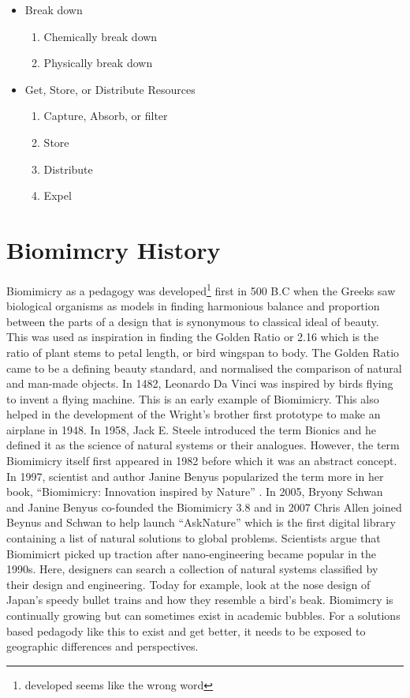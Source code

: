 \begin{itemize}
\item Break down
  \begin{enumerate}
    \item Chemically break down
    \item Physically break down
  \end{enumerate}

\item Get, Store, or Distribute Resources
  \begin{enumerate}
    \item Capture, Absorb, or filter
    \item Store
    \item Distribute
    \item Expel
  \end{enumerate}
  
\end{itemize}

\section{Biomimcry History}

Biomimicry as a pedagogy was developed\footnote{developed seems like the wrong word} first in 500 B.C when the Greeks saw biological organisms as models in finding harmonious balance and proportion between the parts of a design that is synonymous to classical ideal of beauty. This was used as inspiration in finding the Golden Ratio or 2.16 which is the ratio of plant stems to petal length, or bird wingspan to body. The Golden Ratio came to be a defining beauty standard, and normalised the comparison of natural and man-made objects. In 1482, Leonardo Da Vinci was inspired by birds flying to invent a flying machine. This is an early example of Biomimicry. This also helped in the development of the Wright's brother first prototype to make an airplane in 1948. In 1958, Jack E. Steele introduced the term Bionics and he defined it as the science of natural systems or their analogues.  However, the term Biomimicry itself first appeared in 1982 before which it was an abstract concept. In 1997, scientist and author Janine Benyus popularized the term more in her book, ``Biomimicry: Innovation inspired by Nature'' . In 2005, Bryony Schwan and Janine Benyus co-founded the Biomimicry 3.8 and in 2007 Chris Allen joined Beynus and Schwan to help launch ``AskNature'' which is the first digital library containing a list of natural solutions to global problems. Scientists argue that Biomimicrt picked up traction after nano-engineering became popular in the 1990s. Here, designers can search a collection of natural systems classified by their design and engineering. Today for example, look at the nose design of Japan's speedy bullet trains and how they resemble a bird's beak. Biomimcry is continually growing but can sometimes exist in academic bubbles. For a solutions based pedagody like this to exist and get better, it needs to be exposed to geographic differences and perspectives. 

